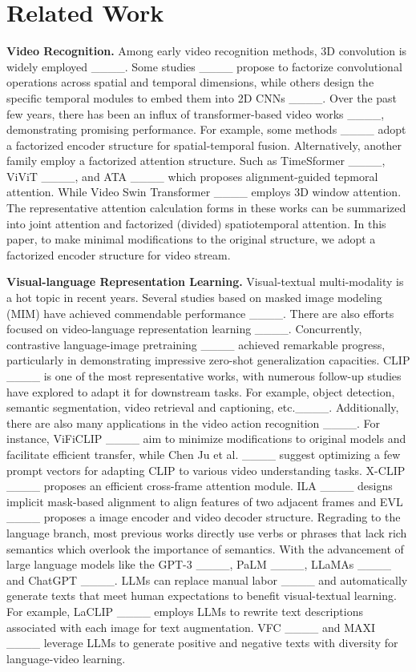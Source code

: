\section{Related Work}
\label{sec:related work}
\textbf{Video Recognition.} Among early video recognition methods, 3D convolution is widely employed ____. Some studies ____ propose to factorize convolutional operations across spatial and temporal dimensions, while others design the specific temporal modules to embed them into 2D CNNs ____. Over the past few years, there has been an influx of transformer-based video works ____, demonstrating promising performance. For example, some methods ____ adopt a factorized encoder structure for spatial-temporal fusion. Alternatively, another family employ a factorized attention structure. Such as TimeSformer ____, ViViT ____, and ATA ____ which proposes alignment-guided tepmoral attention. While Video Swin Transformer ____ employs 3D window attention. The representative attention calculation forms in these works can be summarized into joint attention and factorized (divided) spatiotemporal attention. In this paper, to make minimal modifications to the original structure, we adopt a factorized encoder structure for video stream. 

\noindent
\textbf{Visual-language Representation Learning.} Visual-textual multi-modality is a hot topic in recent years. Several studies based on masked image modeling (MIM) have achieved commendable performance ____. There are also efforts focused on video-language representation learning ____. Concurrently, contrastive language-image pretraining ____ achieved remarkable progress, particularly in demonstrating impressive zero-shot generalization capacities. CLIP ____ is one of the most representative works, with numerous follow-up studies have explored to adapt it for downstream tasks. For example, object detection, semantic segmentation, video retrieval and captioning, etc.____. Additionally, there are also many applications in the video action recognition ____. For instance, ViFiCLIP ____ aim to minimize modifications to original models and facilitate efficient transfer, while Chen Ju et al. ____ suggest optimizing a few prompt vectors for adapting CLIP to various video understanding tasks. X-CLIP ____ proposes an efficient cross-frame attention module. ILA ____ designs implicit mask-based alignment to align features of two adjacent frames and EVL ____ proposes a image encoder and video decoder structure. Regrading to the language branch, most previous works directly use verbs or phrases that lack rich semantics which overlook the importance of semantics. With the advancement of large language models like the GPT-3 ____, PaLM ____, LLaMAs ____ and ChatGPT ____. LLMs can replace manual labor ____ and automatically generate texts that meet human expectations to benefit visual-textual learning. For example, LaCLIP ____ employs LLMs to rewrite text descriptions associated with each image for text augmentation. VFC ____ and MAXI ____ leverage LLMs to generate positive and negative texts with diversity for language-video learning. 

